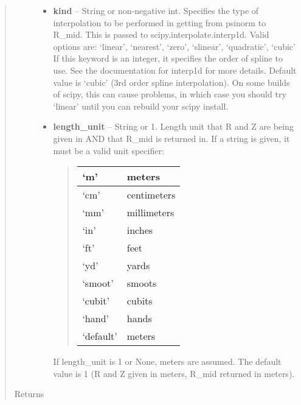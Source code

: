 \documentclass[letterpaper,10pt,english]{sphinxmanual}
\begin{document}
\begin{fulllineitems}
\begin{fulllineitems}
\begin{quote}
\begin{description}
\begin{itemize}
\item {} 
\textbf{kind} --
String or non-negative int. Specifies the type of interpolation
to be performed in getting from psinorm to R\_mid. This is
passed to scipy.interpolate.interp1d. Valid options are:
`linear', `nearest', `zero', `slinear', `quadratic', `cubic'
If this keyword is an integer, it specifies the order of spline
to use. See the documentation for interp1d for more details.
Default value is `cubic' (3rd order spline interpolation). On
some builds of scipy, this can cause problems, in which case
you should try `linear' until you can rebuild your scipy install.

\item {} 
\textbf{length\_unit} --
String or 1. Length unit that R and Z are being given
in AND that R\_mid is returned in. If a string is given, it
must be a valid unit specifier:
\begin{quote}

\begin{tabulary}{\linewidth}{|L|L|}
\hline

`m'
 & 
meters
\\\hline

`cm'
 & 
centimeters
\\\hline

`mm'
 & 
millimeters
\\\hline

`in'
 & 
inches
\\\hline

`ft'
 & 
feet
\\\hline

`yd'
 & 
yards
\\\hline

`smoot'
 & 
smoots
\\\hline

`cubit'
 & 
cubits
\\\hline

`hand'
 & 
hands
\\\hline

`default'
 & 
meters
\\\hline
\end{tabulary}

\end{quote}

If length\_unit is 1 or None, meters are assumed. The default
value is 1 (R and Z given in meters, R\_mid returned in meters).

\end{itemize}

\item[{Returns}] \leavevmode


\end{description}
\end{quote}
\end{fulllineitems}
\end{fulllineitems}
\end{document}
